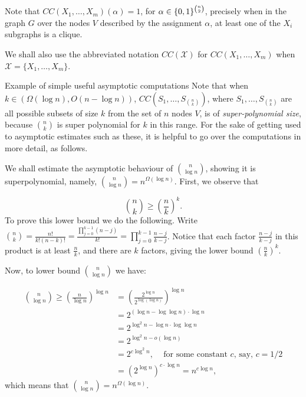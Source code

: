 Note that $CC\left(X_1, \ldots, X_m\right)(\alpha)=1$, for $\alpha\in\{0,1\}^{n\choose 2}$, precisely when in the graph $G$ over the nodes $V$ described by the assignment $\alpha$, at least one of the $X_i$ subgraphs is a clique. 

We shall also use the abbreviated notation $CC(\mathcal X)$ for $CC(X_1,\dots,X_m)$ when $\mathcal X = \{X_1,\dots,X_m\}$.


\begin{trailer}{Example of simple useful asymptotic computations}
Note that when $k\in(\Omega(\log n),O(n-\log n))$, $CC\left(S_1, \ldots, S_{n\choose k}\right)$, where $S_1,\dots,S_{n\choose k}$ are all possible subsets of size $k$ from the set of $n$ nodes $V$, is of \emph{super-polynomial size}, because $ n\choose k$ is super polynomial for $k$ in this range. For the sake of getting used to asymptotic estimates such as these, it is helpful to go over the computations in more detail, as follows.

We shall estimate the asymptotic behaviour of $\binom{n}{\log n} $, showing it is superpolynomial, namely, $\binom{n}{\log n} =
n^{\Omega(\log n)}$. First, we observe that

$$\binom{n}{k} \ge\left(\frac{n}{k}\right)^k. $$
To prove this lower bound we do the following.
Write $\binom{n}{k}=\frac{n!}{k!(n-k)!}=
\frac{\prod_{j=0}^{k-1}(n-j)}{k!}=\prod_{j=0}^{k-1} \frac{n-j}{k-j}$. Notice that each factor $\frac{n-j}{k-j}$ in this product is at least $\frac{n}{k}$, and there are $k$ factors, giving the lower bound $\left(\frac{n}{k}\right)^k$. 

Now, to lower bound $\binom{n}{\log n} $ we have:

\[  
\begin{aligned}
 \binom{n}{\log n} \geq\left(\frac{n}{\log n}\right)^{\log n}
& =
\left(
    \frac{2^{\log n}}
        {2^{\log (\log n)}}\right)^{\log n} \\
& =2^{(\log n-\log \log n) \cdot \log n} \\
& =2^{\log^2n-\log n \cdot \log \log n} \\
& =2^{\log ^2 n-o(\log n)} \\
& = 2^{c \log ^2 n} \text {, ~~~for some constant $c$, say, $c=1/2$} \\
& =\left(2^{\log n}\right)^{c \cdot \log n}=
n^{c \log n},
\end{aligned}
\]
which means that $\binom{n}{\log n}= n^{\Omega(\log n)}$.




\end{trailer}

